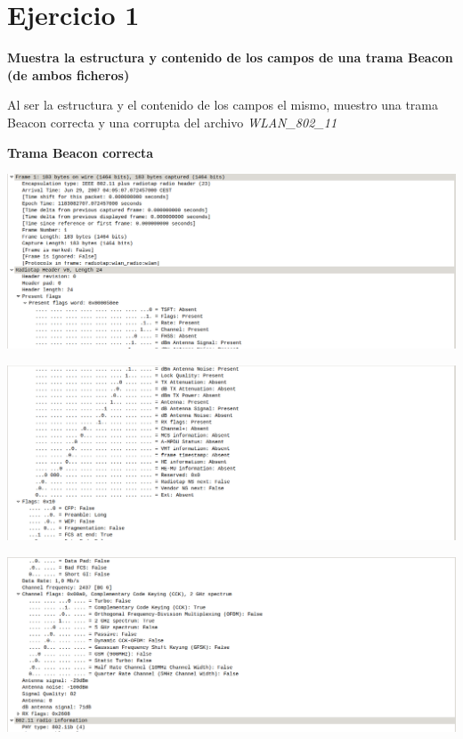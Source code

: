 \documentclass{article}
\begin{document}
\section{Ejercicio 1}

\textbf{Muestra la estructura y contenido de los campos de una trama Beacon (de ambos
ficheros)}

Al ser la estructura y el contenido de los campos el mismo, muestro una trama Beacon correcta y una corrupta del archivo \textit{WLAN\_802\_11}

\textbf{Trama Beacon correcta}

\begin{center}
\includegraphics[scale=0.3]{WLAN/correcto1.png}
\end{center}
\begin{center}
\includegraphics[scale=0.3]{WLAN/correcto2.png}
\end{center}
\begin{center}
\includegraphics[scale=0.3]{WLAN/correcto3.png}
\end{center}
\end{document}
